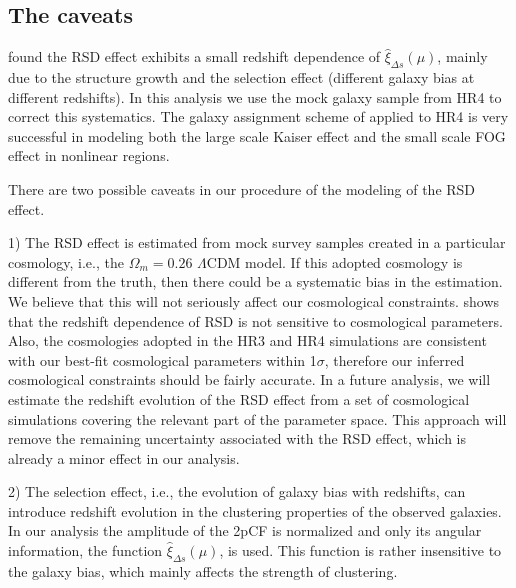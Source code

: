 \documentclass[iop]{emulateapj}
\begin{document}
\subsection{The caveats}\label{sec:caveats}

\cite{Li2014,Li2015} found the RSD effect exhibits a small redshift dependence of $\hat \xi_{\Delta s}(\mu)$, 
mainly due to the structure growth and the selection effect
(different galaxy bias at different redshifts).
In this analysis we use the mock galaxy sample from HR4 to correct this systematics.
The galaxy assignment scheme of \cite{hong2016} applied to HR4 is very successful in modeling both the 
large scale Kaiser effect and the small scale FOG effect in nonlinear regions.

There are two possible caveats in our procedure of the modeling of the RSD effect.

1) The RSD effect is estimated from mock survey samples created in a particular cosmology, 
i.e., the $\Omega_m=0.26$ $\Lambda$CDM model. %
If this adopted cosmology is different from the truth, then there could be a systematic bias in the estimation. %
We believe that this will not seriously affect our cosmological constraints.
\cite{Li2014} shows that the redshift dependence of RSD is not sensitive to cosmological parameters.
Also, the cosmologies adopted in the HR3 and HR4 simulations are consistent with our best-fit cosmological parameters within 1$\sigma$,
therefore our inferred cosmological constraints should be fairly accurate.
In a future analysis,
we will estimate the redshift evolution of the RSD effect from a set of cosmological simulations 
covering the relevant part of the parameter space.
This approach will remove the remaining uncertainty associated with the RSD effect, 
which is already a minor effect in our analysis.


2) The selection effect, i.e., the evolution of galaxy bias with redshifts, 
can introduce redshift evolution in the clustering properties of the observed galaxies.
In our analysis the amplitude of the 2pCF is normalized and only its angular information, 
the function $\hat \xi_{\Delta s}(\mu)$, is used.
This function is rather insensitive to the galaxy bias,
which mainly affects the strength of clustering.
\end{document}
